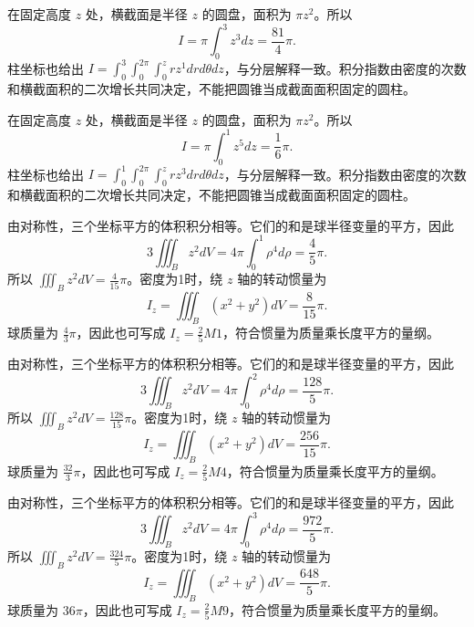 \documentclass[UTF8,12pt,a4paper,fontset=fandol]{ctexart}
\begin{document}
\begin{solve}\label{ans:c39q5}
在固定高度 $z$ 处，横截面是半径 $z$ 的圆盘，面积为 $\pi z^2$。所以
\[
I=\pi\int_0^{3}z^{3}dz=\frac{81}{4}\pi.
\]
柱坐标也给出 $I=\int_0^{3}\int_0^{2\pi}\int_0^zr z^{1}drd\theta dz$，与分层解释一致。积分指数由密度的次数和横截面积的二次增长共同决定，不能把圆锥当成截面面积固定的圆柱。
\end{solve}

\begin{solve}\label{ans:c39q6}
在固定高度 $z$ 处，横截面是半径 $z$ 的圆盘，面积为 $\pi z^2$。所以
\[
I=\pi\int_0^{1}z^{5}dz=\frac{1}{6}\pi.
\]
柱坐标也给出 $I=\int_0^{1}\int_0^{2\pi}\int_0^zr z^{3}drd\theta dz$，与分层解释一致。积分指数由密度的次数和横截面积的二次增长共同决定，不能把圆锥当成截面面积固定的圆柱。
\end{solve}

\begin{solve}\label{ans:c39q7}
由对称性，三个坐标平方的体积积分相等。它们的和是球半径变量的平方，因此
\[
3\iiint_Bz^2dV=4\pi\int_0^{1}\rho^4d\rho=\frac{4}{5}\pi.
\]
所以 $\iiint_Bz^2dV=\frac{4}{15}\pi$。密度为1时，绕 $z$ 轴的转动惯量为
\[
I_z=\iiint_B(x^2+y^2)dV=\frac{8}{15}\pi.
\]
球质量为 $\frac{4}{3}\pi$，因此也可写成 $I_z=\frac25M1$，符合惯量为质量乘长度平方的量纲。
\end{solve}

\begin{solve}\label{ans:c39q8}
由对称性，三个坐标平方的体积积分相等。它们的和是球半径变量的平方，因此
\[
3\iiint_Bz^2dV=4\pi\int_0^{2}\rho^4d\rho=\frac{128}{5}\pi.
\]
所以 $\iiint_Bz^2dV=\frac{128}{15}\pi$。密度为1时，绕 $z$ 轴的转动惯量为
\[
I_z=\iiint_B(x^2+y^2)dV=\frac{256}{15}\pi.
\]
球质量为 $\frac{32}{3}\pi$，因此也可写成 $I_z=\frac25M4$，符合惯量为质量乘长度平方的量纲。
\end{solve}

\begin{solve}\label{ans:c39q9}
由对称性，三个坐标平方的体积积分相等。它们的和是球半径变量的平方，因此
\[
3\iiint_Bz^2dV=4\pi\int_0^{3}\rho^4d\rho=\frac{972}{5}\pi.
\]
所以 $\iiint_Bz^2dV=\frac{324}{5}\pi$。密度为1时，绕 $z$ 轴的转动惯量为
\[
I_z=\iiint_B(x^2+y^2)dV=\frac{648}{5}\pi.
\]
球质量为 $36\pi$，因此也可写成 $I_z=\frac25M9$，符合惯量为质量乘长度平方的量纲。
\end{solve}
\end{document}
